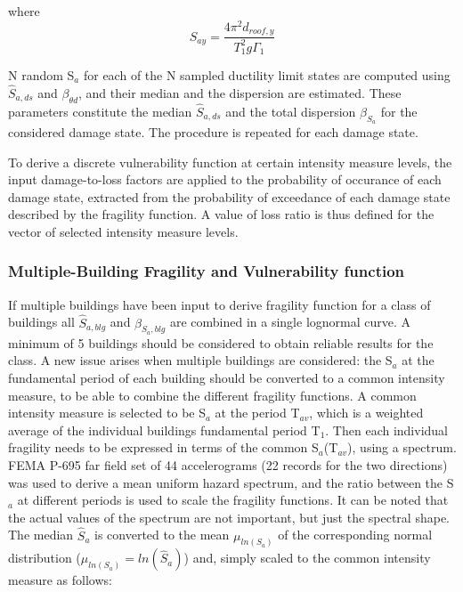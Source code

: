 where
\begin{equation}
S_{ay} = \frac{4 \pi^2 d_{roof,y}}{T_1^2 g \Gamma_1}
\label{eq:Say}
\end{equation}

N random S$_a$ for each of the N sampled ductility limit states are computed using $\hat{S}_{a,ds}$ and $\beta_{\theta d}$, and their median and the dispersion are estimated. These parameters constitute the median $\hat{S}_{a,ds}$ and the total dispersion $\beta_{S_a}$ for the considered damage state. The procedure is repeated for each damage state.

To derive a discrete vulnerability function at certain intensity measure levels, the input damage-to-loss factors are applied to the probability of occurance of each damage state, extracted from the probability of exceedance of each damage state described by the fragility function. A value of loss ratio is thus defined for the vector of selected intensity measure levels.

\subsubsection{Multiple-Building Fragility and Vulnerability function}
\label{subsubsec:multiple-buildings}
If multiple buildings have been input to derive fragility function for a class of buildings all $\hat{S}_{a, blg}$ and $\beta_{S_a, blg}$ are combined in a single lognormal curve. A minimum of 5 buildings should be considered to obtain reliable results for the class. 
A new issue arises when multiple buildings are considered: the S$_a$ at the fundamental period of each building should be converted to a common intensity measure, to be able to combine the different fragility functions. A common intensity measure is selected to be S$_a$ at the period T$_{av}$, which is a weighted average of the individual buildings fundamental period T$_1$. Then each individual fragility needs to be expressed in terms of the common S$_a$(T$_{av}$), using a spectrum. FEMA P-695 far field set of 44 accelerograms (22 records for the two directions) was used to derive a mean uniform hazard spectrum, and the ratio between the S$_a$ at different periods is used to scale the fragility functions. It can be noted that the actual values of the spectrum are not important, but just the spectral shape. 
The median $\hat{S}_a$ is converted to the mean $\mu_{ln(S_a)}$ of the corresponding normal distribution ($\mu_{ln(S_a)} = ln(\hat{S}_a)$) and, simply scaled to the common intensity measure as follows:

